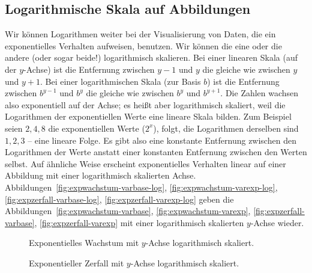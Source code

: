 \documentclass[a4paper,12pt,oneside,leqno]{scrartcl}%
\newcommand{\enquote}[1]{\frqq{}#1\flqq{}}
\begin{document}
\subsection{Logarithmische Skala auf Abbildungen}
Wir können Logarithmen weiter bei der Visualisierung von Daten, die ein exponentielles Verhalten aufweisen, benutzen.  
Wir können die eine oder die andere (oder sogar beide!) logarithmisch skalieren.  
Bei einer linearen Skala (auf der $y$-Achse) ist die Entfernung zwischen $y-1$ und $y$ die gleiche wie zwischen $y$ und $y+1$.  
Bei einer logarithmischen Skala (zur Basis $b$) ist die Entfernung zwischen $b^{y-1}$ und $b^{y}$ die gleiche wie zwischen $b^{y}$ und $b^{y+1}$.  
Die Zahlen wachsen also exponentiell auf der Achse; es heißt aber \enquote{logarithmisch} skaliert, weil die Logarithmen der exponentiellen Werte eine lineare Skala bilden.  
Zum Beispiel seien $2,4,8$ die exponentiellen Werte ($2^{x}$), folgt, die Logarithmen derselben sind $1,2,3$ -- eine lineare Folge.  
Es gibt also eine konstante Entfernung zwischen den Logarithmen der Werte anstatt einer konstanten Entfernung zwischen den Werten selbst.  
Auf ähnliche Weise erscheint exponentielles Verhalten \enquote{linear} auf einer Abbildung mit einer logarithmisch skalierten Achse. Abbildungen~\ref{fig:expwachstum-varbase-log}, \ref{fig:expwachstum-varexp-log}, \ref{fig:expzerfall-varbase-log}, \ref{fig:expzerfall-varexp-log} geben die Abbildungen~\ref{fig:expwachstum-varbase}, \ref{fig:expwachstum-varexp}, \ref{fig:expzerfall-varbase}, \ref{fig:expzerfall-varexp} mit einer logarithmisch skalierten $y$-Achse wieder.

\begin{figure}[H]
\begin{center}
 \qquad
{}
\end{center}
\caption{Exponentielles Wachstum mit $y$-Achse logarithmisch skaliert.}
\label{fig:expwachstum-log}
\end{figure}
\begin{figure}[H]
\begin{center}
 \qquad
{}
\end{center}
\caption{Exponentieller Zerfall mit $y$-Achse logarithmisch skaliert.}\label{fig:expzerfall-log}
\end{figure}
\end{document}
